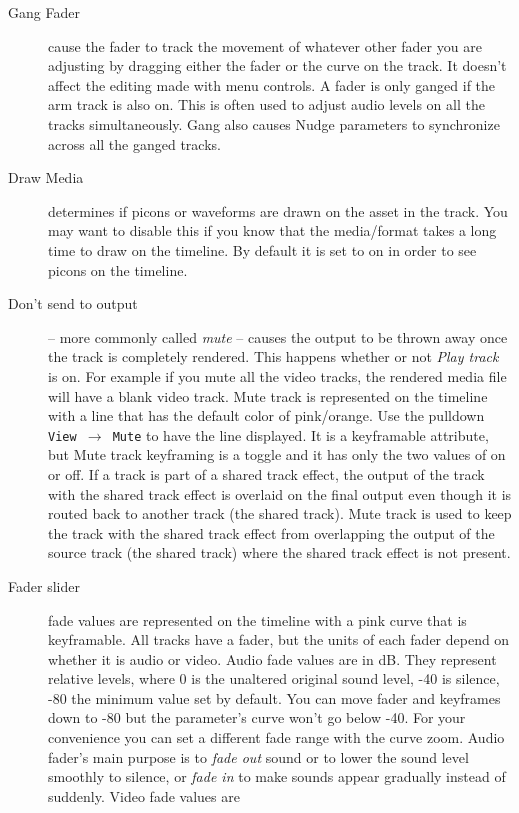 \begin{description}
\item[Gang Fader] cause the fader to track the movement of
  whatever other fader you are adjusting by dragging either the fader
  or the curve on the track.  It doesn't affect the editing made with
  menu controls.  A fader is only ganged if the arm track is also on.
  This is often used to adjust audio levels on all the tracks
  simultaneously.  Gang also causes Nudge parameters to synchronize
  across all the ganged tracks.
\item[Draw Media] determines if picons or waveforms are drawn on
  the asset in the track.  You may want to disable this if you know
  that the media/format takes a long time to draw on the timeline.  By
  default it is set to on in order to see picons on the timeline.
\item[Don’t send to output] -- more commonly called
  \textit{mute} -- causes the output to be thrown away once the track is
  completely rendered. This happens whether or not \textit{Play track}
  is on.  For example if you mute all the video tracks, the rendered
  media file will have a blank video track.  Mute track is represented
  on the timeline with a line that has the default color of
  pink/orange.  Use the pulldown \texttt{View $\rightarrow$ Mute} to
  have the line displayed.  It is a keyframable attribute, but Mute
  track keyframing is a toggle and it has only the two values of on or
  off. If a track is part of a shared track effect, the output of the
  track with the shared track effect is overlaid on the final output
  even though it is routed back to another track (the shared track).
  Mute track is used to keep the track with the shared track effect
  from overlapping the output of the source track (the shared track)
  where the shared track effect is not present.
\item[Fader slider] fade values are represented on the timeline
  with a pink curve that is keyframable.  All tracks have a fader, but
  the units of each fader depend on whether it is audio or video.
  Audio fade values are in dB. They represent relative levels, where 0
  is the unaltered original sound level, -40 is silence, -80 the
  minimum value set by default.  You can move fader and keyframes down
  to -80 but the parameter's curve won't go below -40.  For your
  convenience you can set a different fade range with the curve zoom.
  Audio fader’s main purpose is to \textit{fade out} sound or to lower
  the sound level smoothly to silence, or \textit{fade in} to make
  sounds appear gradually instead of suddenly.  Video fade values are

\end{description}
